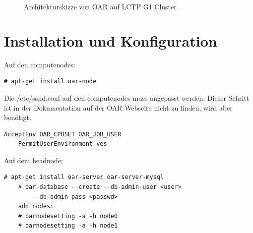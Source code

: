     \begin{figure}[h]
    \centering
{}
    \caption{Architekturskizze von OAR auf LCTP G1 Cluster} 
\end{figure}
\newpage

\section{Installation und Konfiguration}
    Auf den computenodes:
    \begin{lstlisting}[style=Bash]
    # apt-get install oar-node
	\end{lstlisting}
    Die /etc/sshd.conf auf den computenodes muss angepasst werden.
    Dieser Schritt ist in der Dokumentation auf der OAR Webseite nicht zu finden, wird aber benötigt.
    \begin{lstlisting}[style=Bash]
    AcceptEnv OAR_CPUSET OAR_JOB_USER
    PermitUserEnvironment yes
	\end{lstlisting}
    Auf dem headnode:
    \begin{lstlisting}[style=Bash]
    # apt-get install oar-server oar-server-mysql
    # oar-database --create --db-admin-user <user> 
        --db-admin-pass <passwd>
    add nodes:
    # oarnodesetting -a -h node0
    # oarnodesetting -a -h node1
	\end{lstlisting}
